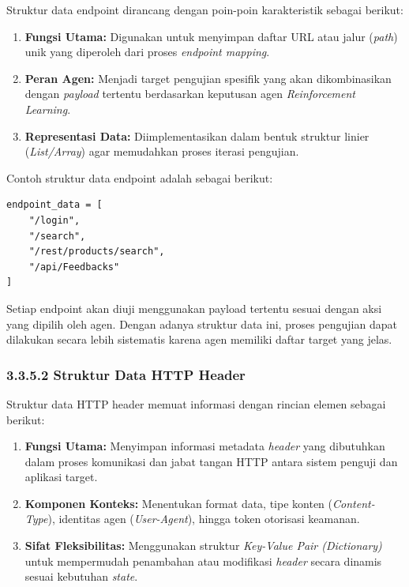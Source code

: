 Struktur data endpoint dirancang dengan poin-poin karakteristik sebagai berikut:

\begin{enumerate}
    \item \textbf{Fungsi Utama:} Digunakan untuk menyimpan daftar URL atau jalur (\textit{path}) unik yang diperoleh dari proses \textit{endpoint mapping}.
    \item \textbf{Peran Agen:} Menjadi target pengujian spesifik yang akan dikombinasikan dengan \textit{payload} tertentu berdasarkan keputusan agen \textit{Reinforcement Learning}.
    \item \textbf{Representasi Data:} Diimplementasikan dalam bentuk struktur linier (\textit{List/Array}) agar memudahkan proses iterasi pengujian.
\end{enumerate}

Contoh struktur data endpoint adalah sebagai berikut:

\begin{verbatim}
endpoint_data = [
    "/login",
    "/search",
    "/rest/products/search",
    "/api/Feedbacks"
]
\end{verbatim}

Setiap endpoint akan diuji menggunakan payload tertentu sesuai dengan aksi yang dipilih oleh agen. Dengan adanya struktur data ini, proses pengujian dapat dilakukan secara lebih sistematis karena agen memiliki daftar target yang jelas.

\subsubsection{3.3.5.2 Struktur Data HTTP Header}

Struktur data HTTP header memuat informasi dengan rincian elemen sebagai berikut:

\begin{enumerate}
    \item \textbf{Fungsi Utama:} Menyimpan informasi metadata \textit{header} yang dibutuhkan dalam proses komunikasi dan jabat tangan HTTP antara sistem penguji dan aplikasi target.
    \item \textbf{Komponen Konteks:} Menentukan format data, tipe konten (\textit{Content-Type}), identitas agen (\textit{User-Agent}), hingga token otorisasi keamanan.
    \item \textbf{Sifat Fleksibilitas:} Menggunakan struktur \textit{Key-Value Pair (Dictionary)} untuk mempermudah penambahan atau modifikasi \textit{header} secara dinamis sesuai kebutuhan \textit{state}.
\end{enumerate}

